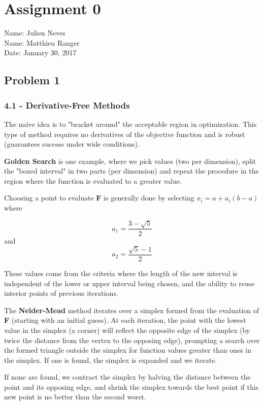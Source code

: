 \documentclass{article}
\begin{document}
\section*{Assignment 0}
Name: Julien Neves\\
Name: Matthieu Ranger\\
Date: January 30, 2017

\subsection*{Problem 1}

\subsubsection*{4.1 - Derivative-Free Methods}

The naive idea is to "bracket around" the acceptable region in optimization. This type of method requires no derivatives of the objective function and is robust (guarantees success under wide conditions).

\textbf{Golden Search} is one example, where we pick values (two per dimension), split the "boxed interval" in two parts (per dimension) and repeat the procedure in the region where the function is evaluated to a greater value. 

Choosing a point to evaluate \textbf{F} is generally done by selecting $x_i = a + a_i (b-a)$ where 

$$ a_1 = \frac{3-\sqrt{5}}{2}$$ and $$a_2 = \frac{\sqrt{5} - 1}{2}$$

These values come from the criteria where the length of the new interval is independent of the lower or upper interval being chosen, and the ability to reuse interior points of previous iterations.

The \textbf{Nelder-Mead} method iterates over a simplex formed from the evaluation of \textbf{F} (starting with an initial guess). At each iteration, the point with the lowest value in the simplex (a corner) will reflect the opposite edge of the simplex (by twice the distance from the vertex to the opposing edge), prompting a search over the formed triangle outside the simplex for function values greater than ones in the simplex. If one is found, the simplex is expanded and we iterate.

If none are found, we contract the simplex by halving the distance between the point and its opposing edge, and shrink the simplex towards the best point if this new point is no better than the second worst. 
\end{document}
